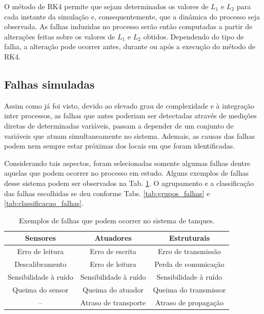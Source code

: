O método de RK4 permite que sejam determinados os valores de $L_1$ e $L_2$ para
cada instante da simulação e, consequentemente, que a dinâmica do processo seja
observada. As falhas induzidas no processo serão então computadas a partir de
alterações feitas sobre os valores de $L_1$ e $L_2$ obtidos. Dependendo do tipo
de falha, a alteração pode ocorrer antes, durante ou após a execução do método
de RK4.

\subsection{Falhas simuladas}
Assim como já foi visto, devido ao elevado grau de complexidade e à integração
inter processos, as falhas que antes poderiam ser detectadas através de medições
diretas de determinadas variáveis, passam a depender de um conjunto de variáveis
que atuam simultaneamente no sistema.  Ademais, as causas das falhas podem nem
sempre estar próximas dos locais em que foram identificadas.

Considerando tais aspectos, foram selecionadas somente algumas falhas dentre
aquelas que podem ocorrer no processo em estudo. Alguns exemplos de falhas desse
sistema podem ser observados na Tab. \ref{tab:selecao_falhas}. O agrupamento e a
classificação das falhas escolhidas se deu conforme Tabs.
\ref{tab:grupos_falhas} e \ref{tab:classificacao_falhas}.

\begin{table}[!htb]
\small
\centering
\caption{Exemplos de falhas que podem ocorrer no sistema de tanques.}
\label{tab:selecao_falhas}
\vspace{0.25cm}
\begin{tabular}{|c|c|c|}
\hline
{\bf Sensores} & {\bf Atuadores} & {\bf Estruturais}\\
\hline
\hline
Erro de leitura & Erro de escrita & Erro de transmissão\\
\hline
Descalibramento & Erro de leitura & Perda de comunicação\\
\hline
Sensibilidade à ruído & Sensibilidade à ruído & Sensibilidade à ruído\\
\hline
Queima do sensor & Queima do atuador & Queima do transmissor\\
\hline
-- & Atraso de transporte & Atraso de propagação\\
\hline
\end{tabular}
\end{table}

